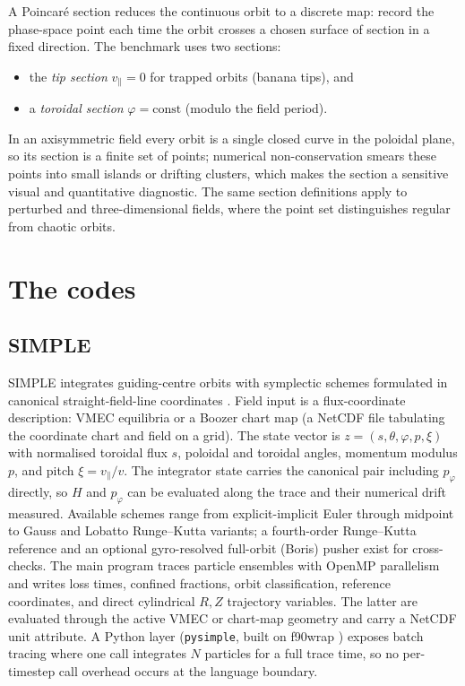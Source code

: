 \documentclass[11pt,a4paper]{article}
\newcommand{\code}[1]{\texttt{#1}}
\begin{document}
A Poincar\'e section reduces the continuous orbit to a discrete map: record
the phase-space point each time the orbit crosses a chosen surface of
section in a fixed direction. The benchmark uses two sections:
\begin{itemize}
\item the \emph{tip section} $v_\parallel = 0$ for trapped orbits (banana
  tips), and
\item a \emph{toroidal section} $\varphi = \mathrm{const}$ (modulo the field
  period).
\end{itemize}
In an axisymmetric field every orbit is a single closed curve in the poloidal
plane, so its section is a finite set of points; numerical non-conservation
smears these points into small islands or drifting clusters, which makes the
section a sensitive visual and quantitative diagnostic. The same section
definitions apply to perturbed and three-dimensional fields, where the point
set distinguishes regular from chaotic orbits.

\section{The codes}
\label{sec:codes}

\subsection{SIMPLE}

SIMPLE \citep{albert2020jcp} integrates guiding-centre orbits with symplectic
schemes formulated in canonical straight-field-line coordinates
\citep{albert2025}. Field input is a flux-coordinate description: VMEC
equilibria or a Boozer chart map (a NetCDF file tabulating the coordinate
chart and field on a grid). The state vector is
$z = (s, \theta, \varphi, p, \xi)$ with normalised toroidal flux $s$,
poloidal and toroidal angles, momentum modulus $p$, and pitch
$\xi = v_\parallel/v$. The integrator state carries the canonical pair
including $p_\varphi$ directly, so $H$ and $p_\varphi$ can be evaluated along
the trace and their numerical drift measured. Available schemes range
from explicit-implicit Euler through midpoint to Gauss and Lobatto
Runge--Kutta variants; a fourth-order Runge--Kutta reference and an optional
gyro-resolved full-orbit (Boris) pusher exist for cross-checks. The main
program traces particle ensembles with OpenMP parallelism and writes loss
times, confined fractions, orbit classification, reference coordinates, and
direct cylindrical $R,Z$ trajectory variables. The latter are evaluated
through the active VMEC or chart-map geometry and carry a NetCDF unit
attribute. A Python layer
(\code{pysimple}, built on f90wrap \citep{kermode2020}) exposes batch tracing
where one call integrates $N$ particles for a full trace time, so no
per-timestep call overhead occurs at the language boundary.
\end{document}
